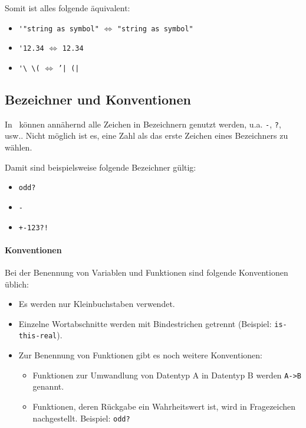 		Somit ist alles folgende äquivalent:
		\begin{itemize}
			\item \lstinline[language = Racket]|'"string as symbol"| \(\iff\) \lstinline[language = Racket]|"string as symbol"|
			\item \lstinline[language = Racket]|'12.34| \(\iff\) \lstinline[language = Racket]|12.34|
			\item \lstinline[language = Racket]|'\ \(| \(\iff\) \texttt{'| (|}
		\end{itemize}

\subsection{Bezeichner und Konventionen}

	In \racket\, können annähernd alle Zeichen in Bezeichnern genutzt werden, u.a. \texttt{-}, \texttt{?}, usw.. Nicht möglich ist es, eine Zahl als das erste Zeichen eines Bezeichners zu wählen.
	
	Damit sind beispielsweise folgende Bezeichner gültig:
	\begin{itemize}
		\item \texttt{odd?}
		\item \texttt{-}
		\item \texttt{+-123?!}
	\end{itemize}

	\paragraph{Konventionen}
		Bei der Benennung von Variablen und Funktionen sind folgende Konventionen üblich:
		\begin{itemize}
			\item Es werden nur Kleinbuchstaben verwendet.
			\item Einzelne Wortabschnitte werden mit Bindestrichen getrennt (Beispiel: \texttt{is-this-real}).
			\item Zur Benennung von Funktionen gibt es noch weitere Konventionen:
				\begin{itemize}
					\item Funktionen zur Umwandlung von Datentyp A in Datentyp B werden \texttt{A->B} genannt.
					\item Funktionen, deren Rückgabe ein Wahrheitswert ist, wird in Fragezeichen nachgestellt. Beispiel: \texttt{odd?}
				\end{itemize}
		\end{itemize}

